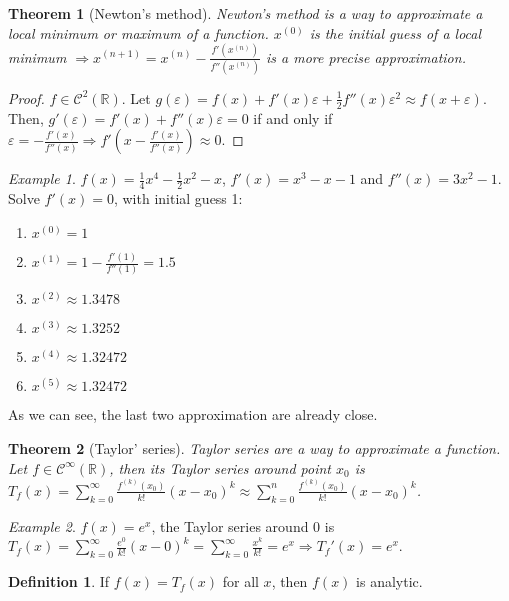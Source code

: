 \documentclass{article}
\newcommand{\DS}{\displaystyle}
\newcommand{\Ar}{\Rightarrow}
\newenvironment{enumarabic}{\begin{enumerate}[label=(\arabic*)]}{\end{enumerate}}
\theoremstyle{definition}
\newtheorem{definition}{Definition}[section]
\theoremstyle{definition}
\theoremstyle{plain}
\newtheorem{theorem}{Theorem}[section]
\theoremstyle{plain}
\theoremstyle{plain}
\theoremstyle{plain}
\theoremstyle{definition}
\theoremstyle{remark}
\theoremstyle{remark}
\theoremstyle{remark}
\newtheorem{examplet}{Example}[theorem]
\theoremstyle{remark}
\newcommand{\R}{\mathbb{R}}
\newcommand{\C}{\mathcal{C}}
\newcommand{\E}{\varepsilon}
\begin{document}
\begin{theorem}[Newton's method]
  Newton's method is a way to approximate a local minimum or maximum of a function. $x^{(0)}$ is the initial guess of a local minimum $\Ar x^{(n+1)} = x^{(n)} - \frac{f'(x^{(n)})}{f''(x^{(n)})}$ is a more precise approximation.
\end{theorem}

\begin{proof}
  $f \in \C^2(\R)$. Let $g(\E) = f(x) + f'(x)\E + \frac{1}{2}f''(x)\E^2 \approx f(x+\E)$. Then, $g'(\E) = f'(x) + f''(x)\E = 0$ if and only if $\E = -\frac{f'(x)}{f''(x)} \Ar f'(x - \frac{f'(x)}{f''(x)}) \approx 0$.
\end{proof}

\begin{examplet}
  $f(x) = \frac{1}{4}x^4 - \frac{1}{2}x^2 - x$, $f'(x) = x^3 - x - 1$ and $f''(x) = 3x^2 - 1$. Solve $f'(x) = 0$, with initial guess 1:
  \begin{enumarabic}
  \item $x^{(0)} = 1$
  \item $x^{(1)} = 1 - \frac{f'(1)}{f''(1)} = 1.5$
  \item $x^{(2)} \approx 1.3478$
  \item $x^{(3)} \approx 1.3252$
  \item $x^{(4)} \approx 1.32472$
  \item $x^{(5)} \approx 1.32472$
  \end{enumarabic}
  As we can see, the last two approximation are already close.
\end{examplet}


\begin{theorem}[Taylor' series]
  Taylor series are a way to approximate a function. Let $f \in \C^\infty(\R)$, then its Taylor series around point $x_0$ is $\DS T_f(x) = \sum_{k=0}^\infty \frac{f^{(k)}(x_0)}{k!}(x-x_0)^k \approx \sum_{k=0}^n \frac{f^{(k)}(x_0)}{k!}(x-x_0)^k$.
\end{theorem}

\begin{examplet}
  $f(x) = e^x$, the Taylor series around 0 is $\DS T_f(x) = \sum_{k=0}^\infty \frac{e^0}{k!}(x-0)^k = \sum_{k=0}^\infty \frac{x^k}{k!} = e^x \Ar T_f'(x) = e^x$.
\end{examplet}


\begin{definition}
  If $f(x) = T_f(x)$ for all $x$, then $f(x)$ is analytic.
\end{definition}
\end{document}

